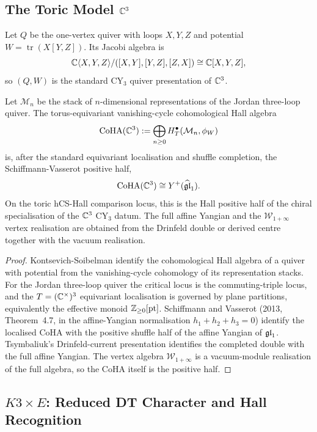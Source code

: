 \subsection{The Toric Model $\mathbb{C}^3$}
\label{wn:subsec:C3-SV-positive-half}

Let $Q$ be the one-vertex quiver with loops $X,Y,Z$ and potential
$W=\operatorname{tr}(X[Y,Z])$. Its Jacobi algebra is
\[
 \mathbb{C}\langle X,Y,Z\rangle/
 ([X,Y],[Y,Z],[Z,X])
 \cong \mathbb{C}[X,Y,Z],
\]
so $(Q,W)$ is the standard CY$_3$ quiver presentation of $\mathbb{C}^3$.

\begin{theorem}
\label{wn:thm:C3-SV}
Let $\mathcal M_n$ be the stack of $n$-dimensional representations of
the Jordan three-loop quiver. The torus-equivariant vanishing-cycle
cohomological Hall algebra
\[
 \mathrm{CoHA}(\mathbb{C}^3)
 :=
 \bigoplus_{n\geq0}
 H^\bullet_T(\mathcal M_n,\phi_W)
\]
is, after the standard equivariant localisation and shuffle completion,
the Schiffmann-Vasserot positive half,
\[
 \mathrm{CoHA}(\mathbb{C}^3)
 \cong
 Y^{+}(\widehat{\mathfrak{gl}}_1).
\]
On the toric hCS-Hall comparison locus, this is the Hall positive half
of the chiral specialisation of the $\mathbb{C}^3$ CY$_3$ datum. The full
affine Yangian and the $\mathcal W_{1+\infty}$ vertex realisation are
obtained from the Drinfeld double or derived centre together with the
vacuum realisation.
\end{theorem}

\begin{proof}
Kontsevich-Soibelman identify the cohomological Hall algebra of a
quiver with potential from the vanishing-cycle cohomology of its
representation stacks. For the Jordan three-loop quiver the critical
locus is the commuting-triple locus, and the $T=(\mathbb{C}^\times)^3$
equivariant localisation is governed by plane partitions, equivalently
the effective monoid $\mathbb{Z}_{\geq0}[\mathrm{pt}]$. Schiffmann and Vasserot
(2013, Theorem~4.7, in the affine-Yangian normalisation
$h_1+h_2+h_3=0$) identify the localised CoHA with the positive shuffle
half of the affine Yangian of $\mathfrak{gl}_1$. Tsymbaliuk's
Drinfeld-current presentation identifies the completed double with the
full affine Yangian. The vertex algebra $\mathcal W_{1+\infty}$ is a
vacuum-module realisation of the full algebra, so the CoHA itself is the
positive half.
\end{proof}

\subsection{\texorpdfstring{$K3\times E$}{K3 x E}: Reduced DT Character and Hall Recognition}
\label{wn:subsec:K3E-PO-character}

